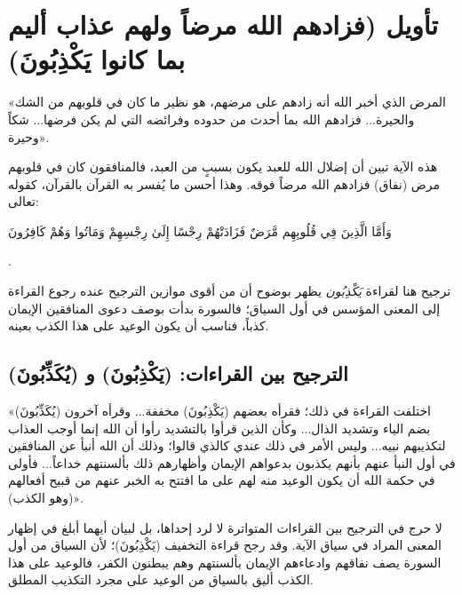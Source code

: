 \separator

\section{تأويل (فزادهم الله مرضاً ولهم عذاب أليم بما كانوا يَكْذِبُونَ)}
 «المرض الذي أخبر الله أنه زادهم على مرضهم، هو نظير ما كان في قلوبهم من الشك والحيرة... فزادهم الله بما أحدث من حدوده وفرائضه التي لم يكن فرضها... شكاً وحيرة».

\begin{fawaid}
هذه الآية تبين أن إضلال الله للعبد يكون بسببٍ من العبد، فالمنافقون كان في قلوبهم مرض (نفاق) فزادهم الله مرضاً فوقه. وهذا أحسن ما يُفسر به القرآن بالقرآن، كقوله تعالى: \begin{ayah}وَأَمَّا الَّذِينَ فِي قُلُوبِهِم مَّرَضٌ فَزَادَتْهُمْ رِجْسًا إِلَىٰ رِجْسِهِمْ وَمَاتُوا وَهُمْ كَافِرُونَ\end{ayah}.
\end{fawaid}

\begin{fawaid}
ترجيح  هنا لقراءة \textit{يَكْذِبُون} يظهر بوضوح أن من أقوى موازين الترجيح عنده رجوع القراءة إلى المعنى المؤسس في أول السياق؛ فالسورة بدأت بوصف دعوى المنافقين الإيمان كذباً، فناسب أن يكون الوعيد على هذا الكذب بعينه.
\end{fawaid}

\subsection{الترجيح بين القراءات: (يَكْذِبُونَ) و (يُكَذِّبُونَ)}
 «اختلفت القراءة في ذلك؛ فقرأه بعضهم (يَكْذِبُونَ) مخففة... وقرأه آخرون (يُكَذِّبُونَ) بضم الياء وتشديد الذال... وكأن الذين قرأوا بالتشديد رأوا أن الله إنما أوجب العذاب لتكذيبهم نبيه... وليس الأمر في ذلك عندي كالذي قالوا؛ وذلك أن الله أنبأ عن المنافقين في أول النبأ عنهم بأنهم يكذبون بدعواهم الإيمان وأظهارهم ذلك بألسنتهم خداعاً... فأولى في حكمة الله أن يكون الوعيد منه لهم على ما افتتح به الخبر عنهم من قبيح أفعالهم (وهو الكذب)».

\begin{fawaid}
لا حرج في الترجيح بين القراءات المتواترة لا لرد إحداها، بل لبيان أيهما أبلغ في إظهار المعنى المراد في سياق الآية. وقد رجح  قراءة التخفيف (يَكْذِبُونَ)؛ لأن السياق من أول السورة يصف نفاقهم وادعاءهم الإيمان بألسنتهم وهم يبطنون الكفر، فالوعيد على هذا الكذب أليق بالسياق من الوعيد على مجرد التكذيب المطلق.
\end{fawaid}


